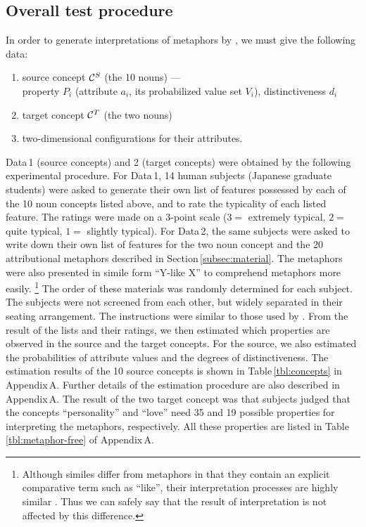 \subsection{Overall test procedure} \label{subsec:test}
In order to generate interpretations of metaphors by \SNAME, 
we must give the following data:
\begin{enumerate}
  \renewcommand{\theenumi}{}
  \renewcommand{\labelenumi}{}
\item source concept ${\cal C}^S$ (the 10 nouns) --- \\[-.5ex]
  \hspace*{3ex}property $P_i$ (attribute $a_i$, its probabilized value set $V_i$), 
  distinctiveness $d_i$
\item target concept ${\cal C}^T$ (the two nouns)
\item two-dimensional configurations for their attributes.
\end{enumerate}
Data\,1 (source concepts) and 2 (target concepts) 
were obtained by the following experimental procedure.
For Data\,1, 14 human subjects (Japanese graduate students)
were asked to generate their own list of features 
possessed by each of the 10 noun concepts listed above, and
to rate the typicality of each listed feature.
The ratings were made on a 3-point scale 
($3=$ extremely typical, $2=$ quite typical, $1=$ slightly typical).
For Data\,2, the same subjects were asked to write down 
their own list of features for the two noun concept and 
the 20 attributional metaphors described in Section\,\ref{subsec:material}.
The metaphors were also presented in simile form ``Y-like X'' 
to comprehend metaphors more easily.
\footnote{
  Although similes differ from metaphors in that they contain an explicit 
  comparative term such as ``like'', their interpretation processes are 
  highly similar \cite{Reynolds80}. Thus we can safely say that 
  the result of interpretation is not affected by this difference.}
The order of these materials was randomly determined for each subject. 
The subjects were not screened from each other, 
but widely separated in their seating arrangement.
The instructions were similar to those used by .
From the result of the lists and their ratings, 
we then estimated which properties are observed in the source and the target concepts.
For the source, we also estimated the probabilities of attribute values and
the degrees of distinctiveness.
The estimation results of the 10 source concepts is shown in Table\,\ref{tbl:concepts} 
in Appendix\,A.
Further details of the estimation procedure are also described in Appendix\,A.
The result of the two target concept was that 
subjects judged that the concepts ``personality'' and ``love'' 
need 35 and 19 possible properties for interpreting the metaphors, respectively.
All these properties are listed in Table\,\ref{tbl:metaphor-free} of Appendix\,A.

